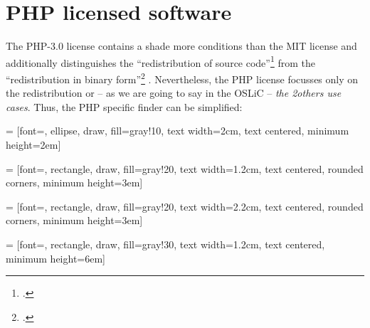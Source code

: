 %
%
%
%
%



\section{PHP licensed software}

The PHP-3.0 license contains a shade more conditions than the MIT license and
additionally distinguishes the \enquote{redistribution of source
code}\footcite[cf.][wp. §1]{Php30OsiLicense2013a} from the
\enquote{redistribution in binary form}\footcite[cf.][wp.
§2]{Php30OsiLicense2013a} . Nevertheless, the PHP license focusses only on the
redistribution or -- as we are going to say in the OSLiC -- \emph{the 2others use
cases}. Thus, the PHP specific finder can be simplified:

 = [font=\small, ellipse, draw, fill=gray!10, 
    text width=2cm, text centered, minimum height=2em]


 = [font=\footnotesize, rectangle, draw, fill=gray!20, 
    text width=1.2cm, text centered, rounded corners, minimum height=3em]

 = [font=\footnotesize, rectangle, draw, fill=gray!20, 
    text width=2.2cm, text centered, rounded corners, minimum height=3em]
    
 = [font=\tiny, rectangle, draw, fill=gray!30, 
    text width=1.2cm, text centered, minimum height=6em]

